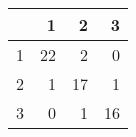 \begin{tabular}{rrrr}
  \hline
 & 1 & 2 & 3 \\ 
  \hline
1 &  22 &   2 &   0 \\ 
  2 &   1 &  17 &   1 \\ 
  3 &   0 &   1 &  16 \\ 
   \hline
\end{tabular}
